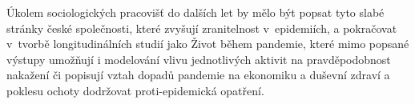 Úkolem sociologických pracovišť do dalších let by mělo být popsat tyto slabé stránky české společnosti, které zvyšují zranitelnost v epidemiích, a pokračovat v tvorbě longitudinálních studií jako Život během pandemie, které mimo popsané výstupy umožňují i modelování vlivu jednotlivých aktivit na pravděpodobnost nakažení či popisují vztah dopadů pandemie na ekonomiku a duševní zdraví a poklesu ochoty dodržovat proti-epidemická opatření.
